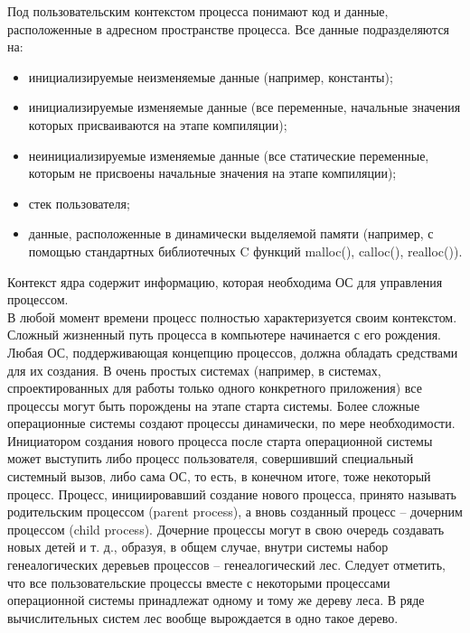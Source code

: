 \documentclass[a4paper]{article}
\begin{document}
Под пользовательским контекстом процесса понимают код и данные, расположенные в адресном пространстве процесса. Все данные подразделяются на:
\begin{itemize}
  \item инициализируемые неизменяемые данные (например, константы);
  \item инициализируемые изменяемые данные (все переменные, начальные значения которых присваиваются на этапе компиляции);
  \item неинициализируемые изменяемые данные (все статические переменные, которым не присвоены начальные значения на этапе компиляции);
  \item стек пользователя;
  \item  данные, расположенные в динамически выделяемой памяти (например, с помощью стандартных библиотечных C функций malloc(), calloc(), realloc()).
\end{itemize}
Контекст ядра содержит информацию, которая необходима ОС для управления процессом.\\
В любой момент времени процесс полностью характеризуется своим контекстом.\\
Сложный жизненный путь процесса в компьютере начинается с его рождения. Любая ОС, поддерживающая концепцию процессов, должна обладать средствами для их создания. В очень простых системах (например, в системах, спроектированных для работы только одного конкретного приложения) все процессы могут быть порождены на этапе старта системы. Более сложные операционные системы создают процессы динамически, по мере необходимости. Инициатором создания нового процесса после старта операционной системы может выступить либо процесс пользователя, совершивший специальный системный вызов, либо сама ОС, то есть, в конечном итоге, тоже некоторый процесс. Процесс, инициировавший создание нового процесса, принято называть родительским процессом (parent process), а вновь созданный процесс – дочерним процессом (child process). Дочерние процессы могут в свою очередь создавать новых детей и т. д., образуя, в общем случае, внутри системы набор генеалогических деревьев процессов – генеалогический лес. Следует отметить, что все пользовательские процессы вместе с некоторыми процессами операционной системы принадлежат одному и тому же дереву леса. В ряде вычислительных систем лес вообще вырождается в одно такое дерево.\\\\
\end{document}
